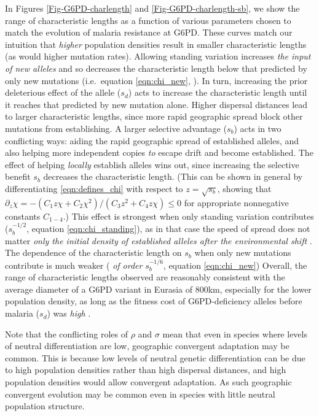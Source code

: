 \documentclass{article}
\newcommand{\gc}[1]{{\it\color{blue} #1} }
\newcommand{\mfp}[1]{{\it\color{red} #1} }
\begin{document}
In Figures \ref{Fig-G6PD-charlength} and \ref{Fig-G6PD-charlength-sb}, we show the range of characteristic lengths as a function 
of various parameters chosen to match the evolution of malaria
resistance at G6PD. 
These curves match our intuition that \gc{higher} population densities result in
smaller characteristic lengths (as would higher mutation rates). 
Allowing standing variation increases \gc{the 
input of new alleles} and so decreases the characteristic length below that predicted
by only new mutations (i.e.\ equation \eqref{eqn:chi_new}, \citet{ralphcoop2010}).
In turn, increasing the prior deleterious effect of the allele ($s_d$)
acts to increase the
characteristic length until it reaches that predicted by new mutation alone. 
Higher dispersal distances lead to larger characteristic lengths, 
since more rapid geographic spread block other mutations from establishing. 
A larger selective advantage ($s_b$) acts in two conflicting
ways: aiding the rapid geographic spread of established alleles, and also helping more independent copies
\mfp{to} escape drift and become established. 
The effect of helping\gc{locally} establish alleles wins out, since increasing the selective benefit $s_b$ decreases the characteristic length. 
 (This can be shown in general by differentiating \eqref{eqn:defines_chi} with respect to $z=\sqrt{s_b}$,
showing that $\partial_{z} \chi = - ( C_1 z \chi + C_2 \chi^2 )/(C_3 z^2 + C_4 z \chi ) \le 0$ for appropriate nonnegative constants $C_{1-4}$.) 
This effect is strongest when only standing variation contributes ($s_b^{-1/2}$, equation \eqref{eqn:chi_standing}), 
as in that case the speed of spread does not matter \mfp{only the
  initial density of established alleles after the environmental shift}. 
The dependence of the characteristic length on $s_b$ when only new
mutations contribute is much weaker (\gc{of order} $s_b^{-1/6}$, equation \eqref{eqn:chi_new})
Overall, the range of characteristic lengths observed are reasonably
consistent with the average diameter of a G6PD variant in Eurasia of
800km, especially for the lower population density, as long as the
fitness cost of G6PD-deficiency alleles before malaria ($s_d$) was \mfp{high}. 

Note that the conflicting roles of $\rho$ and $\sigma$ mean that even in
species where levels of neutral differentiation are low, geographic
convergent adaptation may be common. This is because low levels of
neutral genetic differentiation can be due to high population
densities rather than high dispersal distances, and high population
densities would allow convergent adaptation. As such geographic convergent
evolution may be common even in species with little neutral population structure.
\end{document}
